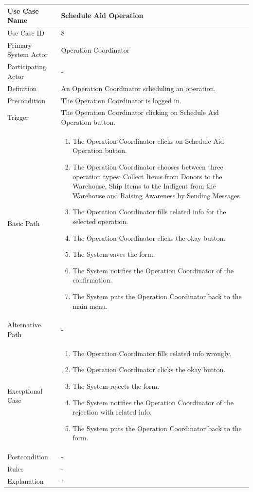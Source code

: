 \documentclass[a4paper,12pt]{report}
\begin{document}
		\begin{tabular}{|m{4cm}|m{11.5cm}|}
			\hline
				Use Case Name & Schedule Aid Operation\\
			\hline
				Use Case ID & 8\\
			\hline
				Primary System Actor & Operation Coordinator\\
			\hline
				Participating Actor & -\\
			\hline
				Definition & An Operation Coordinator scheduling an operation.\\
			\hline
				Precondition & The Operation Coordinator is logged in.\\
			\hline
				Trigger & The Operation Coordinator clicking on Schedule Aid Operation button.\\
			\hline
				Basic Path & \begin{enumerate}
					\item The Operation Coordinator clicks on Schedule Aid Operation button.
					\item The Operation Coordinator chooses between three operation types: Collect Items from Donors to the Warehouse, Ship Items to the Indigent from the Warehouse and Raising Awareness by Sending Messages.
					\item The Operation Coordinator fills related info for the selected operation.
					\item The Operation Coordinator clicks the okay button.
					\item The System saves the form.
					\item The System notifies the Operation Coordinator of the confirmation.
					\item The System puts the Operation Coordinator back to the main menu.
				\end{enumerate}		
				\\
			\hline
				Alternative Path & -\\
			\hline
				Exceptional Case & \begin{enumerate}
					\item The Operation Coordinator fills related info wrongly.
					\item The Operation Coordinator clicks the okay button.
					\item The System rejects the form.
					\item The System notifies the Operation Coordinator of the rejection with related info.
					\item The System puts the Operation Coordinator back to the form.
				\end{enumerate}
				\\
			\hline
				Postcondition & -\\
			\hline
				Rules & -\\
			\hline
				Explanation & -\\
			\hline
		\end{tabular}
\end{document}
